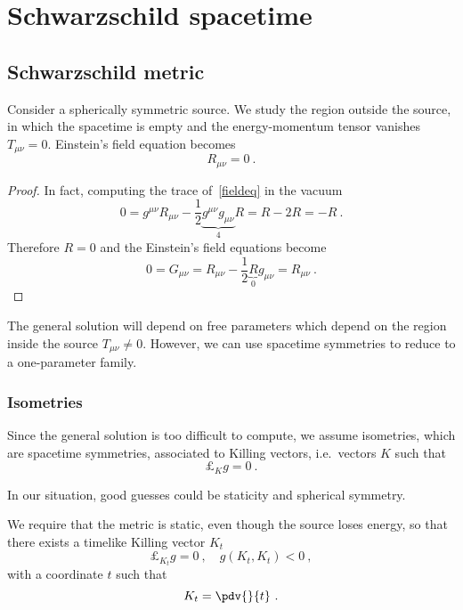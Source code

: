 \part{Schwarzschild spacetime}

\chapter{Schwarzschild metric}

    Consider a spherically symmetric source. We study the region outside the source, in which the spacetime is empty and the energy-momentum tensor vanishes $T_{\mu\nu} = 0$. Einstein's field equation becomes 
    \begin{equation*}
        R_{\mu\nu} = 0 ~.
    \end{equation*}
    \begin{proof}
        In fact, computing the trace of~\eqref{fieldeq} in the vacuum
        \begin{equation*}
            0 = g^{\mu\nu} R_{\mu\nu} - \frac{1}{2} \underbrace{g^{\mu\nu} g_{\mu\nu}}_4 R = R - 2 R = - R ~.
        \end{equation*}
        Therefore $R = 0$ and the Einstein's field equations become
        \begin{equation*}
            0 = G_{\mu\nu} = R_{\mu\nu} - \frac{1}{2} \underbrace{R}_0 g_{\mu\nu} = R_{\mu\nu} ~.
        \end{equation*}
    \end{proof}

    The general solution will depend on free parameters which depend on the region inside the source $T_{\mu\nu} \neq 0$. However, we can use spacetime symmetries to reduce to a one-parameter family. 

\section{Isometries}

    Since the general solution is too difficult to compute, we assume isometries, which are spacetime symmetries, associated to Killing vectors, i.e.~vectors $K$ such that 
    \begin{equation*}
        \pounds_K g = 0 ~.
    \end{equation*}

    In our situation, good guesses could be staticity and spherical symmetry. 

    We require that the metric is static, even though the source loses energy, so that there exists a timelike Killing vector $K_{t}$ 
    \begin{equation*}
        \pounds_{K_{t}} g = 0~, \quad g(K_{t}, K_{t}) < 0 ~,
    \end{equation*}
    with a coordinate $t$ such that 
    \begin{equation*}
        K_{t} = \pdv{}{t} ~.
    \end{equation*}

